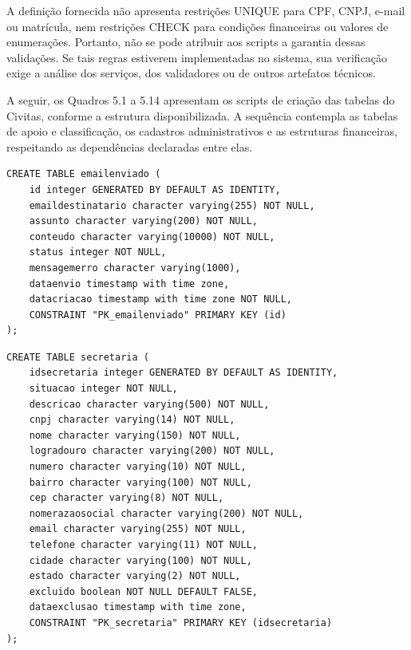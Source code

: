 A definição fornecida não apresenta restrições UNIQUE para CPF, CNPJ, e-mail ou matrícula, nem restrições CHECK para condições financeiras ou valores de enumerações. Portanto, não se pode atribuir aos scripts a garantia dessas validações. Se tais regras estiverem implementadas no sistema, sua verificação exige a análise dos serviços, dos validadores ou de outros artefatos técnicos.

A seguir, os Quadros 5.1 a 5.14 apresentam os scripts de criação das tabelas do Civitas, conforme a estrutura disponibilizada. A sequência contempla as tabelas de apoio e classificação, os cadastros administrativos e as estruturas financeiras, respeitando as dependências declaradas entre elas.

\begin{quadro}[H]
\caption{Script SQL — Tabela emailenviado}
\label{qua:script-emailenviado}
\begin{minipage}{0.96\textwidth}
\begin{lstlisting}[style=academic-sql]
CREATE TABLE emailenviado (
    id integer GENERATED BY DEFAULT AS IDENTITY,
    emaildestinatario character varying(255) NOT NULL,
    assunto character varying(200) NOT NULL,
    conteudo character varying(10000) NOT NULL,
    status integer NOT NULL,
    mensagemerro character varying(1000),
    dataenvio timestamp with time zone,
    datacriacao timestamp with time zone NOT NULL,
    CONSTRAINT "PK_emailenviado" PRIMARY KEY (id)
);
\end{lstlisting}
\end{minipage}
\end{quadro}

\begin{quadro}[H]
\caption{Script SQL — Tabela secretaria}
\label{qua:script-secretaria}
\begin{minipage}{0.96\textwidth}
\begin{lstlisting}[style=academic-sql]
CREATE TABLE secretaria (
    idsecretaria integer GENERATED BY DEFAULT AS IDENTITY,
    situacao integer NOT NULL,
    descricao character varying(500) NOT NULL,
    cnpj character varying(14) NOT NULL,
    nome character varying(150) NOT NULL,
    logradouro character varying(200) NOT NULL,
    numero character varying(10) NOT NULL,
    bairro character varying(100) NOT NULL,
    cep character varying(8) NOT NULL,
    nomerazaosocial character varying(200) NOT NULL,
    email character varying(255) NOT NULL,
    telefone character varying(11) NOT NULL,
    cidade character varying(100) NOT NULL,
    estado character varying(2) NOT NULL,
    excluido boolean NOT NULL DEFAULT FALSE,
    dataexclusao timestamp with time zone,
    CONSTRAINT "PK_secretaria" PRIMARY KEY (idsecretaria)
);
\end{lstlisting}
\end{minipage}
\end{quadro}

